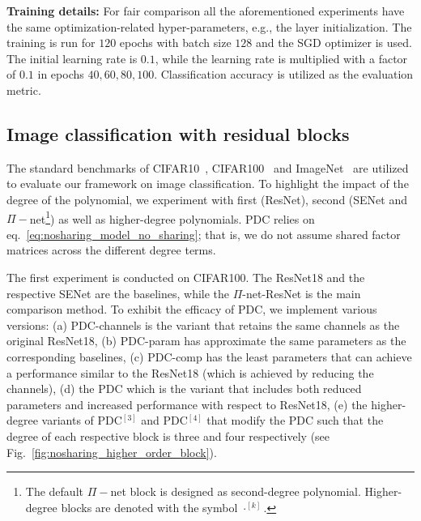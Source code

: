 \documentclass[runningheads]{llncs}
\newcommand{\resnet}{ResNet}
\newcommand{\modelres}{$\Pi$-net-\resnet}
\newcommand{\sne}{SENet}
\newcommand{\noshare}{PDC}
\providecommand\eg{e.g.,}
\providecommand{\citep}{\cite}
\begin{document}
\noindent\textbf{Training details:} For fair comparison all the aforementioned experiments have the same optimization-related hyper-parameters, \eg{} the layer initialization. The training is run for $120$ epochs with batch size $128$ and the SGD optimizer is used. The initial learning rate is $0.1$, while the learning rate is multiplied with a factor of $0.1$ in epochs $40, 60, 80, 100$. 
Classification accuracy is utilized as the evaluation metric. 





\subsection{Image classification with residual blocks}
\label{ssec:nosharing_experiments_image_resnet}



The standard benchmarks of CIFAR10~\cite{krizhevsky2014cifar}, CIFAR100~\cite{CIFAR100} and ImageNet~\citep{russakovsky2015imagenet} are utilized to evaluate our framework on image classification. To highlight the impact of the degree of the polynomial, we experiment with first (\resnet), second (\sne{} and $\Pi-$net\footnote{The default $\Pi-$net block is designed as second-degree polynomial. Higher-degree blocks are denoted with the symbol $\cdot^{[k]}$.}) as well as higher-degree polynomials. \noshare{} relies on eq.~\ref{eq:nosharing_model_no_sharing}; that is, we do not assume shared factor matrices across the different degree terms. 




The first experiment is conducted on CIFAR100. The \resnet18 and the respective \sne{} are the baselines, while the \modelres{} is the main comparison method. To exhibit the efficacy of \noshare, we implement various versions: (a) \noshare-channels is the variant that retains the same channels as the original \resnet18, (b) \noshare-param has approximate the same parameters as the corresponding baselines, (c) \noshare-comp has the least parameters that can achieve a performance similar to the \resnet18 (which is achieved by reducing the channels), (d) the \noshare{} which is the variant that includes both reduced parameters and increased performance with respect to \resnet18, (e) the higher-degree variants of \noshare$^{[3]}$ and \noshare$^{[4]}$  that modify the \noshare{} such that the degree of each respective block is three and four respectively (see Fig.~\ref{fig:nosharing_higher_order_block}). 
\end{document}
